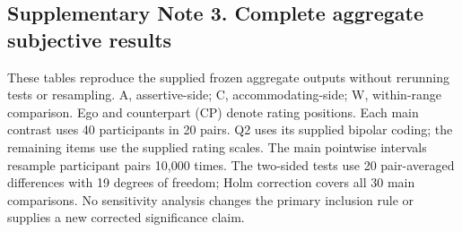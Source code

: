 \clearpage

\subsection*{Supplementary Note 3. Complete aggregate subjective results}

These tables reproduce the supplied frozen aggregate outputs without rerunning tests or resampling. A, assertive-side; C, accommodating-side; W, within-range comparison. Ego and counterpart (CP) denote rating positions. Each main contrast uses 40 participants in 20 pairs. Q2 uses its supplied bipolar coding; the remaining items use the supplied rating scales. The main pointwise intervals resample participant pairs 10,000 times. The two-sided tests use 20 pair-averaged differences with 19 degrees of freedom; Holm correction covers all 30 main comparisons. No sensitivity analysis changes the primary inclusion rule or supplies a new corrected significance claim.

